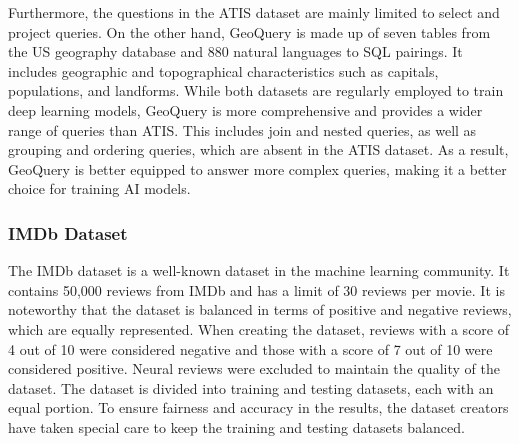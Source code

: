 Furthermore, the questions in the ATIS dataset are mainly limited to select and project queries. On the other hand, GeoQuery is made up of seven tables from the US geography database and 880 natural languages to SQL pairings. It includes geographic and topographical characteristics such as capitals, populations, and landforms. While both datasets are regularly employed to train deep learning models, GeoQuery is more comprehensive and provides a wider range of queries than ATIS. This includes join and nested queries, as well as grouping and ordering queries, which are absent in the ATIS dataset. As a result, GeoQuery is better equipped to answer more complex queries, making it a better choice for training AI models.






\subsubsection{IMDb Dataset}

The IMDb dataset is a well-known dataset in the machine learning community. It contains 50,000 reviews from IMDb and has a limit of 30 reviews per movie\cite{maas-EtAl:2011:ACL-HLT2011}. It is noteworthy that the dataset is balanced in terms of positive and negative reviews, which are equally represented. When creating the dataset, reviews with a score of 4 out of 10 were considered negative and those with a score of 7 out of 10 were considered positive. Neural reviews were excluded to maintain the quality of the dataset. The dataset is divided into training and testing datasets, each with an equal portion. To ensure fairness and accuracy in the results, the dataset creators have taken special care to keep the training and testing datasets balanced.

